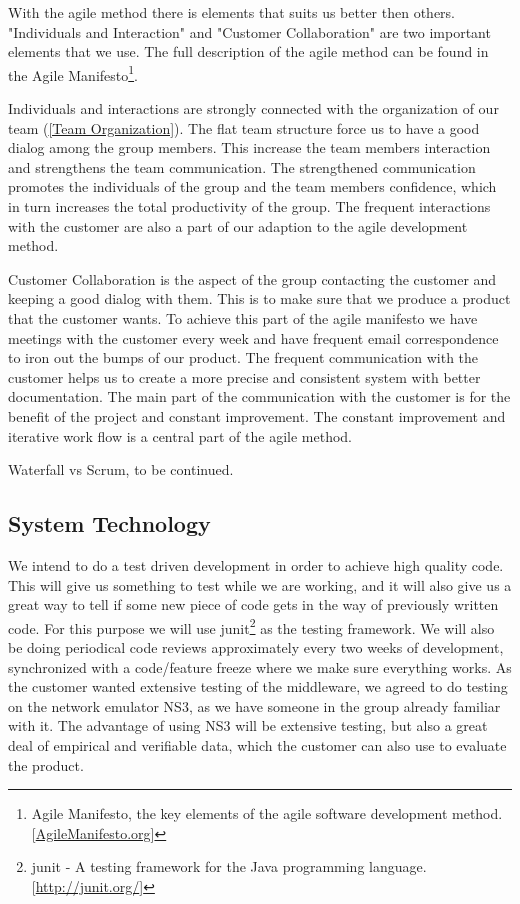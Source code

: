     With the agile method there is elements that suits us better then others. "Individuals and Interaction" and "Customer Collaboration" are two important elements that we use. The full description of the agile method can be found in the Agile Manifesto\footnote
        {Agile Manifesto, the key elements of the agile software development method. [\href{http://http://agilemanifesto.org/}{AgileManifesto.org}]}.
    
    Individuals and interactions are strongly connected with the organization of our team (\ref{Team Organization}). The flat team structure force us to have a good dialog among the group members. This increase the team members interaction and strengthens the team communication. The strengthened communication promotes the individuals of the group and the team members confidence, which in turn increases the total productivity of the group. The frequent interactions with the customer are also a part of our adaption to the agile development method. 
    
    Customer Collaboration is the aspect of the group contacting the customer and keeping a good dialog with them. This is to make sure that we produce a product that the customer wants. To achieve this part of the agile manifesto we have meetings with the customer every week and have frequent email correspondence to iron out the bumps of our product. The frequent communication with the customer helps us to create a more precise and consistent system with better documentation. The main part of the communication with the customer is for the benefit of the project and constant improvement. The constant improvement and iterative work flow is a central part of the agile method. 

    Waterfall vs Scrum, to be continued. 

    \subsection{System Technology}\label{System Technology}
    
    We  intend to do a test driven development in order to achieve high quality code. This will give us something to test while we are working, and it will also give us a great way to tell if some new piece of code gets in the way of previously written code. For this purpose we will use \gls{junit}\footnote{\gls{junit} - A testing framework for the Java programming language. [\url{http://junit.org/}]} as the testing framework. We will also be doing periodical code reviews approximately every two weeks of development, synchronized with a code/feature freeze where we make sure everything works. As the customer wanted extensive testing of the middleware, we agreed to do testing on the network emulator NS3, as we have someone in the group already familiar with it. The advantage of using NS3 will be extensive testing, but also a great deal of empirical and verifiable data, which the customer can also use to evaluate the product.

